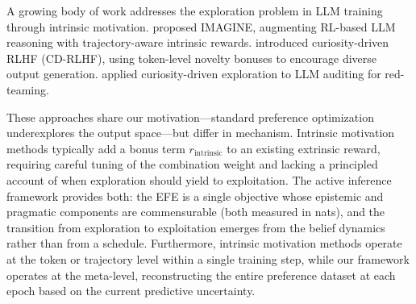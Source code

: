 \documentclass[11pt]{article}
\begin{document}
A growing body of work addresses the exploration problem in LLM training through intrinsic motivation. \citet{gao2025imagine} proposed IMAGINE, augmenting RL-based LLM reasoning with trajectory-aware intrinsic rewards. \citet{chen2025curiosity} introduced curiosity-driven RLHF (CD-RLHF), using token-level novelty bonuses to encourage diverse output generation. \citet{zheng2025calm} applied curiosity-driven exploration to LLM auditing for red-teaming.

These approaches share our motivation---standard preference optimization underexplores the output space---but differ in mechanism. Intrinsic motivation methods typically add a bonus term $r_{\mathrm{intrinsic}}$ to an existing extrinsic reward, requiring careful tuning of the combination weight and lacking a principled account of when exploration should yield to exploitation. The active inference framework provides both: the EFE is a single objective whose epistemic and pragmatic components are commensurable (both measured in nats), and the transition from exploration to exploitation emerges from the belief dynamics rather than from a schedule. Furthermore, intrinsic motivation methods operate at the token or trajectory level within a single training step, while our framework operates at the meta-level, reconstructing the entire preference dataset at each epoch based on the current predictive uncertainty.




\end{document}
